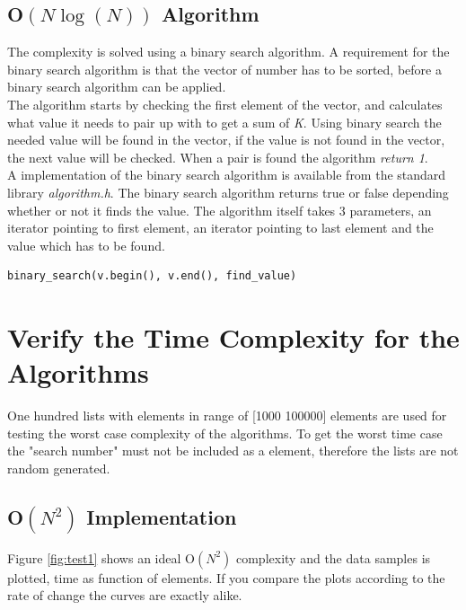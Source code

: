 \subsection{O\(\left( N\log {(N)}  \right) \) Algorithm}
\label{sec:algorithm2}
The complexity is solved using a binary search algorithm. A requirement for the binary search algorithm is that the vector of number has to be sorted, before a binary search algorithm can be applied. \\
The algorithm starts by checking the first element of the vector, and calculates what value it needs to pair up with to get a sum of \emph{K}.  Using binary search the needed value will be found in the vector, if the value is not found in the vector, the next value will be checked.  When a pair is found the algorithm \emph{return 1}. \\

A implementation of the binary search algorithm is available from the standard library \emph{algorithm.h}. The binary search algorithm returns true or false depending whether or not it finds the value. The algorithm itself takes 3 parameters, an iterator pointing to first element, an iterator pointing to last element and the value which has to be found. 
\begin{lstlisting}
binary_search(v.begin(), v.end(), find_value)
\end{lstlisting}

\newpage
\section{Verify the Time Complexity for the Algorithms}
\label{sec:ver}
One hundred lists with elements in range of [1000 100000] elements are used for testing the worst case complexity of the algorithms. To get the worst time case the "search number" must not be included as a element, therefore the lists are not random generated. 


\subsection{O\(\left( { N }^{ 2 } \right)\) Implementation}
Figure \ref{fig:test1} shows an ideal O\(\left( { N }^{ 2 } \right)\) complexity and the data samples is plotted, time as function of elements. If you compare the plots according to the rate of change the curves are exactly alike. \\

